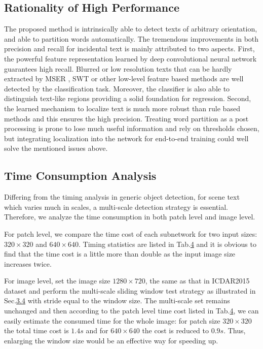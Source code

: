 \documentclass[10pt,twocolumn,letterpaper]{article}
\begin{document}
	\subsection{Rationality of High Performance}
	\label{Sec.4.4}
	The proposed method is intrinsically able to detect texts of arbitrary orientation, and able to partition words automatically.
	The tremendous improvements in both precision and recall for incidental text is mainly attributed to two aspects. First, the powerful feature representation learned by deep convolutional neural network guarantees high recall. Blurred or low resolution texts that can be hardly extracted by MSER \cite{mser1}, SWT \cite{swt} or other low-level feature based methods \cite{yfpan} are well detected by the classification task. 
	Moreover, the classifier is also able to distinguish text-like regions providing a solid foundation for regression.
	Second, the learned mechanism to localize text is much more robust than rule based methods and this ensures the high precision. 
	Treating word partition as a post processing is prone to lose much useful information and rely on thresholds chosen, but integrating localization into the network for end-to-end training could well solve the mentioned issues above.
		
	\subsection{Time Consumption Analysis}
	\label{Sec.4.5}
	Differing from the timing analysis in generic object detection, for scene text which varies much in scales, a multi-scale detection strategy is essential. Therefore, we analyze the time consumption in both patch level and image level.
	
	For patch level, we compare the time cost of each subnetwork for two input sizes:  $320 \times 320$ and $640 \times 640$. 
	Timing statistics are listed in Tab.\hyperref[Tab.4]{4} and it is obvious to find that the time cost is a little more than double as the input image size increases twice.
	
	For image level, set the image size $1280 \times 720$, the same as that in ICDAR2015 dataset and perform the multi-scale sliding window test strategy as illustrated in Sec.\hyperref[Sec.3.4]{3.4} with stride equal to the window size. The multi-scale set remains unchanged and then according to the patch level time cost listed in Tab.\hyperref[Tab.4]{4}, we can easily estimate the consumed time for the whole image: for patch size $320 \times 320$ the total time cost is $1.4s$ and for $640 \times 640$ the cost is reduced to $0.9s$. Thus, enlarging the window size would be an effective way for speeding up.
	
\end{document}
